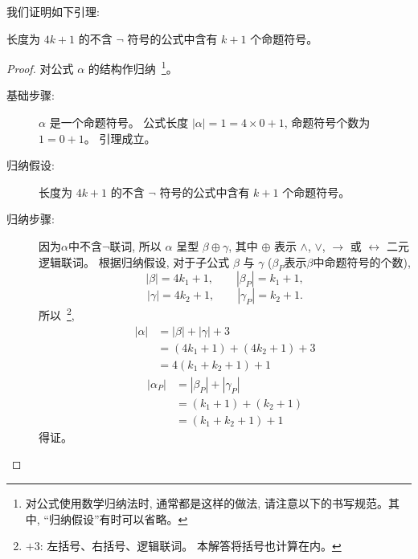 \documentclass[a4paper, justified]{tufte-handout}
\begin{document}
\begin{solution}
  我们证明如下引理:
  \begin{lemma*}
    长度为 $4k + 1$ 的不含 $\lnot$ 符号的公式中含有 $k + 1$ 个命题符号。
  \end{lemma*}

  \begin{proof}
    对公式 $\alpha$ 的结构作归纳~\footnote{对公式使用数学归纳法时, 通常都是这样的做法,
    请注意以下的书写规范。其中, ``归纳假设''有时可以省略。}。

    \begin{description}
      \item[基础步骤:] $\alpha$ 是一个命题符号。
        公式长度 $|\alpha| = 1 = 4 \times 0 + 1$, 命题符号个数为 $1 = 0 + 1$。 引理成立。
      \item[归纳假设:] 长度为 $4k + 1$ 的不含 $\lnot$ 符号的公式中含有 $k + 1$ 个命题符号。
      \item[归纳步骤:] 因为$\alpha$中不含$\lnot$联词,
        所以 $\alpha$ 呈型 $\beta \oplus \gamma$,
        其中 $\oplus$ 表示 $\land$, $\lor$, $\to$ 或 $\leftrightarrow$ 二元逻辑联词。
        根据归纳假设, 对于子公式 $\beta$ 与 $\gamma$
        ($\beta_{P}$表示$\beta$中命题符号的个数),
        \[
          |\beta| = 4k_{1} + 1, \qquad |\beta_{P}| = k_{1} + 1,
        \]
        \[
          |\gamma| = 4k_{2} + 1, \qquad |\gamma_{P}| = k_{2} + 1.
        \]
        所以~\footnote{$+3$: 左括号、右括号、逻辑联词。 本解答将括号也计算在内。},
        \begin{align*}
          |\alpha| &= |\beta| + |\gamma| + 3 \\
                   &= (4k_{1} + 1) + (4k_{2} + 1) + 3 \\
                   &= 4(k_{1} + k_{2} + 1) + 1
        \end{align*}
        \begin{align*}
          |\alpha_{P}| &= |\beta_{P}| + |\gamma_{P}| \\
                   &= (k_{1} + 1) + (k_{2} + 1) \\
                   &= (k_{1} + k_{2} + 1) + 1
        \end{align*}
        得证。
    \end{description}
  \end{proof}
\end{solution}
\end{document}
